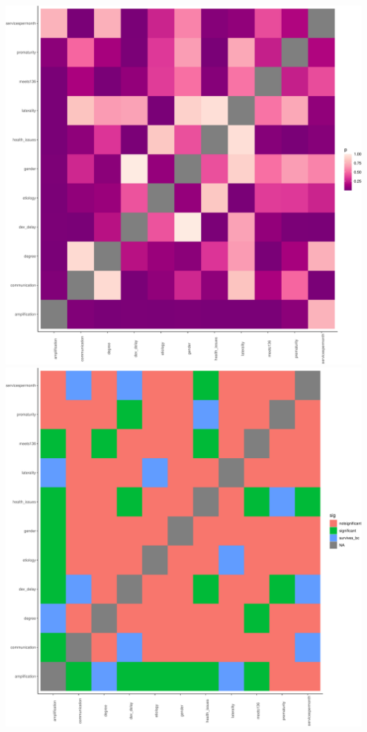 \documentclass[english,man]{apa6}
\begin{document}
\includegraphics{ELSSP_paper_files/figure-latex/relationships-plot-1.pdf} \includegraphics{ELSSP_paper_files/figure-latex/relationships-plot-2.pdf}
\end{document}
